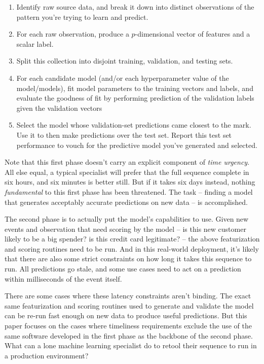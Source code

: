 \documentclass{article}
\begin{document}
\begin{enumerate}
 \item Identify raw source data, and break it down into distinct observations of
the pattern you're trying to learn and predict.
 \item For each raw observation, produce a $p$-dimensional vector of features
and a scalar label.
 \item Split this collection into disjoint training, validation, and testing
sets.
 \item For each candidate model (and/or each hyperparameter value of the
model/models), fit model parameters to the training vectors and labels, and
evaluate the goodness of fit by performing prediction of the validation labels
given the validation vectors
 \item Select the model whose validation-set predictions came closest to the
mark. Use it to then make predictions over the test set. Report this test set
performance to vouch for the predictive model you've generated and selected.
\end{enumerate}

 Note that this first phase doesn't carry an explicit component of \emph{time
urgency}. All else equal, a typical specialist will prefer that the full
sequence complete in six hours, and six minutes is better still. But if it takes
six days instead, nothing \emph{fundamental} to this first phase has been
threatened. The task -- finding a model that generates acceptably accurate
predictions on new data -- is accomplished.

 The second phase is to actually put the model's capabilities to use. Given new
events and observation that need scoring by the model -- is this new customer
likely to be a big spender? is this credit card legitimate? -- the above
featurization and scoring routines need to be run. And in this real-world
deployment, it's likely that there are also some strict constraints on how long
it takes this sequence to run. All predictions go stale, and some use cases need
to act on a prediction within milliseconds of the event itself.

 There are some cases where these latency constraints aren't binding. The exact
same featurization and scoring routines used to generate and validate the model
can be re-run fast enough on new data to produce useful predictions. But this
paper focuses on the cases where timeliness requirements exclude the use of the
same software developed in the first phase as the backbone of the second phase.
What can a lone machine learning specialist do to retool their sequence to run
in a production environment?
\end{document}
